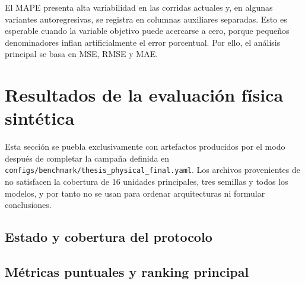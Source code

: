 El MAPE presenta alta variabilidad en las corridas actuales y, en algunas variantes autoregresivas, se registra en columnas auxiliares separadas. Esto es esperable cuando la variable objetivo puede acercarse a cero, porque pequeños denominadores inflan artificialmente el error porcentual. Por ello, el análisis principal se basa en MSE, RMSE y MAE.

\section{Resultados de la evaluación física sintética}
\label{sec:resultados-benchmark-fisico}

Esta sección se puebla exclusivamente con artefactos producidos por el modo  después de completar la campaña definida en \nolinkurl{configs/benchmark/thesis_physical_final.yaml}. Los archivos provenientes de  no satisfacen la cobertura de 16 unidades principales, tres semillas y todos los modelos, y por tanto no se usan para ordenar arquitecturas ni formular conclusiones.

\subsection{Estado y cobertura del protocolo}

\subsection{Métricas puntuales y ranking principal}

